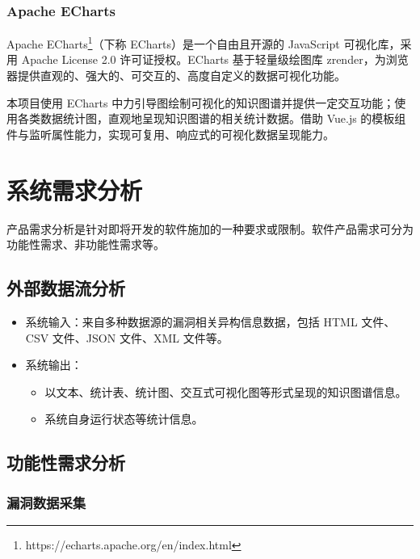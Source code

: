 \documentclass[a4paper,AutoFakeBold,oneside,12pt]{book}
\begin{document}
\subsection{Apache ECharts}

Apache ECharts\footnote{https://echarts.apache.org/en/index.html}（下称 ECharts）是一个自由且开源的 JavaScript 可视化库，采用 Apache License 2.0 许可证授权。ECharts 基于轻量级绘图库 zrender，为浏览器提供直观的、强大的、可交互的、高度自定义的数据可视化功能。

本项目使用 ECharts 中力引导图绘制可视化的知识图谱并提供一定交互功能；使用各类数据统计图，直观地呈现知识图谱的相关统计数据。借助 Vue.js 的模板组件与监听属性能力，实现可复用、响应式的可视化数据呈现能力。

\chapter{系统需求分析}

产品需求分析是针对即将开发的软件施加的一种要求或限制。软件产品需求可分为功能性需求、非功能性需求等。\cite{bourque_guide_2014}

\section{外部数据流分析}

\begin{itemize}
	\item 系统输入：来自多种数据源的漏洞相关异构信息数据，包括 HTML 文件、CSV 文件、JSON 文件、XML 文件等。
	\item 系统输出：
	      \begin{itemize}
		      \item 以文本、统计表、统计图、交互式可视化图等形式呈现的知识图谱信息。
		      \item 系统自身运行状态等统计信息。
	      \end{itemize}
\end{itemize}

\section{功能性需求分析}

\subsection{漏洞数据采集}
\end{document}
